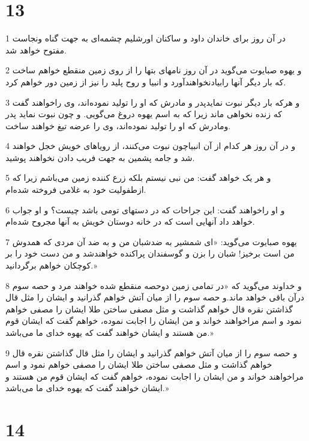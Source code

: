 \chapter{13}

\par 1 در آن روز برای خاندان داود و ساکنان اورشلیم چشمه‌ای به جهت گناه ونجاست مفتوح خواهد شد.
\par 2 و یهوه صبایوت می‌گوید در آن روز نامهای بتها را از روی زمین منقطع خواهم ساخت که بار دیگر آنها رابیادنخواهند‌آورد و انبیا و روح پلید را نیز از زمین دور خواهم کرد.
\par 3 و هر‌که بار دیگر نبوت نمایدپدر و مادرش که او را تولید نموده‌اند، وی راخواهند گفت که زنده نخواهی ماند زیرا که به اسم یهوه دروغ می‌گویی. و چون نبوت نماید پدر ومادرش که او را تولید نموده‌اند، وی را عرضه تیغ خواهند ساخت.
\par 4 و در آن روز هر کدام از آن انبیاچون نبوت می‌کنند، از رویاهای خویش خجل خواهند شد و جامه پشمین به جهت فریب دادن نخواهند پوشید.
\par 5 و هر یک خواهد گفت: من نبی نیستم بلکه زرع کننده زمین می‌باشم زیرا که ازطفولیت خود به غلامی فروخته شده‌ام.
\par 6 و او راخواهند گفت: این جراحات که در دستهای تومی باشد چیست؟ و او جواب خواهد داد آنهایی است که در خانه دوستان خویش به آنها مجروح شده‌ام.
\par 7 یهوه صبایوت می‌گوید: «ای شمشیر به ضدشبان من و به ضد آن مردی که همدوش من است برخیز! شبان را بزن و گوسفندان پراکنده خواهندشد و من دست خود را بر کوچکان خواهم برگردانید.»
\par 8 و خداوند می‌گوید که «در تمامی زمین دوحصه منقطع شده خواهند مرد و حصه سوم درآن باقی خواهد ماند.و حصه سوم را از میان آتش خواهم گذرانید و ایشان را مثل قال گذاشتن نقره قال خواهم گذاشت و مثل مصفی ساختن طلا ایشان را مصفی خواهم نمود و اسم مراخواهند خواند و من ایشان را اجابت نموده، خواهم گفت که ایشان قوم من هستند و ایشان خواهند گفت که یهوه خدای ما می‌باشد.»
\par 9 و حصه سوم را از میان آتش خواهم گذرانید و ایشان را مثل قال گذاشتن نقره قال خواهم گذاشت و مثل مصفی ساختن طلا ایشان را مصفی خواهم نمود و اسم مراخواهند خواند و من ایشان را اجابت نموده، خواهم گفت که ایشان قوم من هستند و ایشان خواهند گفت که یهوه خدای ما می‌باشد.»

\chapter{14}

